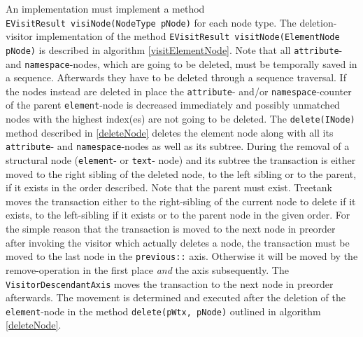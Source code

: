 An implementation must implement a method \\\texttt{EVisitResult visiNode(NodeType pNode)} for each node type. The deletion-visitor implementation of the method \texttt{EVisitResult visitNode(ElementNode pNode)} is described in algorithm \ref{visitElementNode}. Note that all \texttt{attribute}- and \texttt{namespace}-nodes, which are going to be deleted, must be temporally saved in a sequence. Afterwards they have to be deleted through a sequence traversal. If the nodes instead are deleted in place the \texttt{attribute}- and/or \texttt{namespace}-counter of the parent \texttt{element}-node is decreased immediately and possibly unmatched nodes with the highest index(es) are not going to be deleted. The \texttt{delete(INode)} method described in \ref{deleteNode} deletes the element node along with all its \texttt{attribute}- and \texttt{namespace}-nodes as well as its subtree. During the removal of a structural node (\texttt{element}- or \texttt{text}- node) and its subtree the transaction is either moved to the right sibling of the deleted node, to the left sibling or to the parent, if it exists in the order described. Note that the parent must exist. Treetank moves the transaction either to the right-sibling of the current node to delete if it exists, to the left-sibling if it exists or to the parent node in the given order. For the simple reason that the  transaction is moved to the next node in preorder after invoking the visitor which actually deletes a node, the transaction must be moved to the last node in the \texttt{previous::} axis. Otherwise it will be moved by the remove-operation in the first place \emph{and} the axis subsequently. The \texttt{VisitorDescendantAxis} moves the transaction to the next node in preorder afterwards. The movement is determined and executed after the deletion of the \texttt{element}-node in the method \texttt{delete(pWtx, pNode)} outlined in algorithm \ref{deleteNode}.

